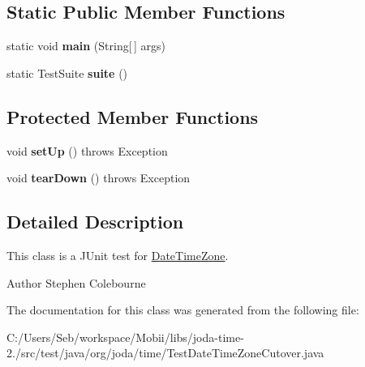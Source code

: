 \subsection*{Static Public Member Functions}
\begin{DoxyCompactItemize}
\item 
\hypertarget{classorg_1_1joda_1_1time_1_1_test_date_time_zone_cutover_af841a266d79ce6ee19a1ced1ef2bac61}{static void {\bfseries main} (String\mbox{[}$\,$\mbox{]} args)}\label{classorg_1_1joda_1_1time_1_1_test_date_time_zone_cutover_af841a266d79ce6ee19a1ced1ef2bac61}

\item 
\hypertarget{classorg_1_1joda_1_1time_1_1_test_date_time_zone_cutover_aef87adfbab43e5805fd6b8602b706dd6}{static Test\-Suite {\bfseries suite} ()}\label{classorg_1_1joda_1_1time_1_1_test_date_time_zone_cutover_aef87adfbab43e5805fd6b8602b706dd6}

\end{DoxyCompactItemize}
\subsection*{Protected Member Functions}
\begin{DoxyCompactItemize}
\item 
\hypertarget{classorg_1_1joda_1_1time_1_1_test_date_time_zone_cutover_a332e90d5d4ba47e329d5a966dcc385dd}{void {\bfseries set\-Up} ()  throws Exception }\label{classorg_1_1joda_1_1time_1_1_test_date_time_zone_cutover_a332e90d5d4ba47e329d5a966dcc385dd}

\item 
\hypertarget{classorg_1_1joda_1_1time_1_1_test_date_time_zone_cutover_a5e9a60bd8de27a9f7273349275e0f3f8}{void {\bfseries tear\-Down} ()  throws Exception }\label{classorg_1_1joda_1_1time_1_1_test_date_time_zone_cutover_a5e9a60bd8de27a9f7273349275e0f3f8}

\end{DoxyCompactItemize}


\subsection{Detailed Description}
This class is a J\-Unit test for \hyperlink{classorg_1_1joda_1_1time_1_1_date_time_zone}{Date\-Time\-Zone}.

\begin{DoxyAuthor}{Author}
Stephen Colebourne 
\end{DoxyAuthor}


The documentation for this class was generated from the following file\-:\begin{DoxyCompactItemize}
\item 
C\-:/\-Users/\-Seb/workspace/\-Mobii/libs/joda-\/time-\/2./src/test/java/org/joda/time/Test\-Date\-Time\-Zone\-Cutover.\-java\end{DoxyCompactItemize}
